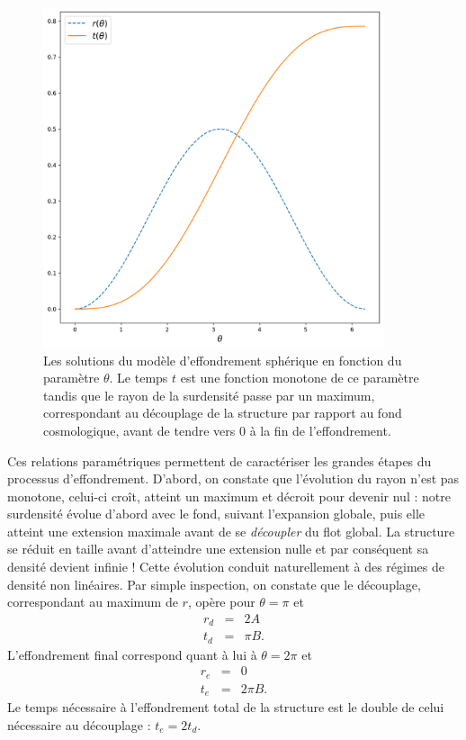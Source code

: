 \begin{figure}[htbp]
	\centering
		\includegraphics[height=10cm]{figs/rtparam.png}
		\caption[Les solutions paramétriques de l'effondrement sphérique]{Les solutions du modèle d'effondrement sphérique en fonction du paramètre $\theta$. Le temps $t$ est une fonction monotone de ce paramètre tandis que le rayon de la surdensité passe par un maximum, correspondant au découplage de la structure par rapport au fond cosmologique, avant de tendre vers 0 à la fin de l'effondrement.}
	\label{f:rtparam}
\end{figure}

Ces relations paramétriques permettent de caractériser les grandes étapes du processus d'effondrement. D'abord, on constate que l'évolution du rayon n'est pas monotone, celui-ci croît, atteint un maximum et décroit pour devenir nul : notre surdensité évolue d'abord avec le fond, suivant l'expansion globale, puis elle atteint une extension maximale avant de se \textit{découpler} du flot global. La structure se réduit en taille avant d'atteindre une extension nulle et par conséquent sa densité devient infinie ! Cette évolution  conduit naturellement à des régimes de densité non linéaires. Par simple inspection, on constate que le découplage, correspondant au maximum de $r$, opère pour $\theta=\pi$ et 
\begin{eqnarray}
r_d&=&2A\\
t_d&=&\pi B.
\end{eqnarray}
L'effondrement final correspond quant à lui à $\theta=2 \pi$ et 
\begin{eqnarray}
r_e&=&0\\
t_e&=&2\pi B.
\end{eqnarray}
Le temps nécessaire à l'effondrement  total de la structure est le double de celui nécessaire au découplage : $t_e=2 t_d$.


